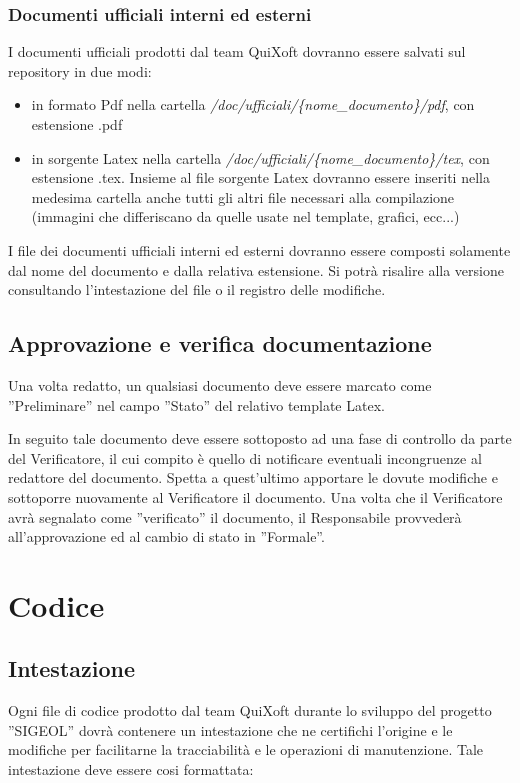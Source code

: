\documentclass[11pt,a4paper]{article}
\begin{document}
\subsubsection{Documenti ufficiali interni ed esterni}
I documenti ufficiali prodotti dal team QuiXoft dovranno essere salvati sul repository in due modi:
\begin{itemize}
	\item in formato Pdf nella cartella \textit{/doc/ufficiali/\{nome\_documento\}/pdf}, con estensione .pdf
	\item in sorgente Latex nella cartella \textit{/doc/ufficiali/\{nome\_documento\}/tex}, con estensione .tex. Insieme al file sorgente Latex dovranno essere inseriti nella medesima cartella anche tutti gli altri file necessari alla compilazione (immagini che differiscano da quelle usate nel template, grafici, ecc...)
\end{itemize}
I file dei documenti ufficiali interni ed esterni dovranno essere composti solamente dal nome del documento e dalla relativa estensione. Si potrà risalire alla versione consultando l'intestazione del file o il registro delle modifiche.
\subsection{Approvazione e verifica documentazione}
Una volta redatto, un qualsiasi documento deve essere marcato come ''Preliminare'' nel campo ''Stato'' del relativo template Latex.

In seguito tale documento deve essere sottoposto ad una fase di controllo da parte del Verificatore, il cui compito è quello di notificare eventuali incongruenze al redattore del documento.
Spetta a quest'ultimo apportare le dovute modifiche e sottoporre nuovamente al Verificatore il documento.
Una volta che il Verificatore avrà segnalato come ''verificato'' il documento, il Responsabile provvederà all'approvazione ed al cambio di stato in ''Formale''.
\section{Codice}
\subsection{Intestazione}
Ogni file di codice prodotto dal team QuiXoft durante lo sviluppo del progetto ''SIGEOL'' dovrà contenere un intestazione che ne certifichi l'origine e le modifiche per facilitarne la tracciabilità e le operazioni di manutenzione.
Tale intestazione deve essere cosi formattata: \\
\end{document}
